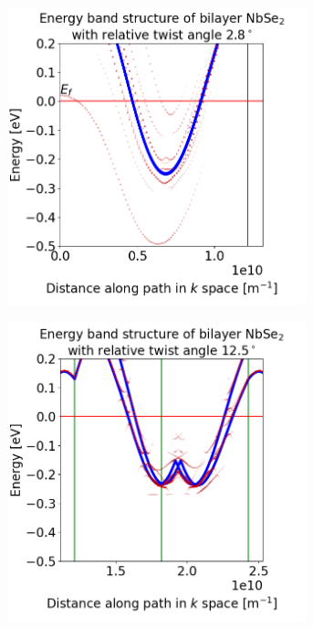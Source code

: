 \documentclass[12pt]{report} %
\begin{document}
%
\begin{figure}[t]
\centering
  \begin{subfigure}[b]{0.475\textwidth}
    \centering
    \includegraphics[width=0.95\textwidth]{flat_band_2.8.png}
    \caption{}
    \label{flat_band_2.8}
  \end{subfigure}
  \hfill
  \begin{subfigure}[b]{0.475\textwidth}
    \centering
    \includegraphics[width=0.95\textwidth]{flat_band_12.5.png}

\end{subfigure}
\end{figure}
\end{document}
